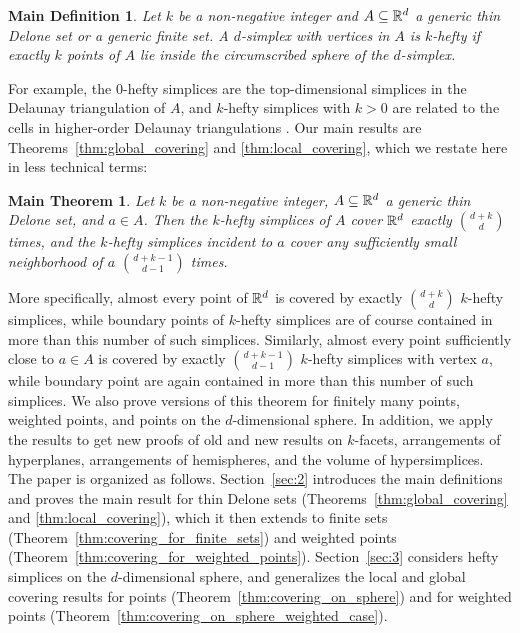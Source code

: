 \documentclass[a4paper,UKenglish,cleveref, autoref,numberwithinsect]{socg-lipics-v2021}
\newcommand {\mm}[1] {\ifmmode{#1}\else{\mbox{\(#1\)}}\fi}
\theoremstyle{plain}
\newtheorem*{supermaintheorem*}{Main Theorem}
\newtheorem*{supermaindefinition*}{Main Definition}
\newcommand{\Rspace}        {\mm{{\mathbb R}}}
\begin{document}
\begin{supermaindefinition*}
  \label{dfn:hefty_simplex}
  Let $k$ be a non-negative integer and $A \subseteq \Rspace^d$ a generic thin Delone set or a generic finite set. 
  A $d$-simplex with vertices in $A$ is \emph{$k$-hefty} if exactly $k$ points of $A$ lie inside the circumscribed sphere of the $d$-simplex.
\end{supermaindefinition*}
For example, the $0$-hefty simplices are the top-dimensional simplices in the Delaunay triangulation of $A$,
and $k$-hefty simplices with $k > 0$ are related to the cells in higher-order Delaunay triangulations \cite{Aur90,EdOs21}.
Our main results are Theorems~\ref{thm:global_covering} and \ref{thm:local_covering}, which we restate here in less technical terms:
\begin{supermaintheorem*}
  Let $k$ be a non-negative integer, $A \subseteq \Rspace^d$ a generic thin Delone set, and $a \in A$.
  Then the $k$-hefty simplices of $A$ cover $\Rspace^d$ exactly $\binom{d+k}{d}$ times, and the $k$-hefty simplices incident to $a$ cover any sufficiently small neighborhood of $a$ $\binom{d+k-1}{d-1}$ times.
\end{supermaintheorem*}
More specifically, almost every point of $\Rspace^d$ is covered by exactly $\binom{d+k}{d}$ $k$-hefty simplices, while boundary points of $k$-hefty simplices are of course contained in more than this number of such simplices.
Similarly, almost every point sufficiently close to $a \in A$ is covered by exactly $\binom{d+k-1}{d-1}$ $k$-hefty simplices with vertex $a$, while boundary point are again contained in more than this number of such simplices.
We also prove versions of this theorem for finitely many points, weighted points, and points on the $d$-dimensional sphere.
In addition, we apply the results to get new proofs of old and new results on $k$-facets, arrangements of hyperplanes, arrangements of hemispheres, and the volume of hypersimplices.
\smallskip
The paper is organized as follows.
Section~\ref{sec:2} introduces the main definitions and proves the main result for thin Delone sets (Theorems~\ref{thm:global_covering} and \ref{thm:local_covering}), which it then extends to finite sets (Theorem~\ref{thm:covering_for_finite_sets}) and weighted points (Theorem~\ref{thm:covering_for_weighted_points}).
%
Section~\ref{sec:3} considers hefty simplices on the $d$-dimensional sphere, and generalizes the local and global covering results for points (Theorem~\ref{thm:covering_on_sphere})
and for weighted points (Theorem~\ref{thm:covering_on_sphere_weighted_case}).
\end{document}
